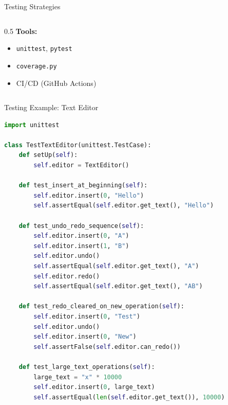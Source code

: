 \documentclass[aspectratio=169,xcolor=dvipsnames]{beamer}
\begin{document}
\begin{frame}{Testing Strategies}
\begin{columns}
\begin{column}{0.5\textwidth}
      \vspace{0.2cm}
      \textbf{Tools:}
      \begin{itemize}
        \item \texttt{unittest}, \texttt{pytest}
        \item \texttt{coverage.py}
        \item CI/CD (GitHub Actions)
      \end{itemize}
    \end{column}
  \end{columns}
\end{frame}

\begin{frame}[fragile]{Testing Example: Text Editor}
\begin{lstlisting}[language=Python, basicstyle=\tiny\ttfamily]
import unittest

class TestTextEditor(unittest.TestCase):
    def setUp(self):
        self.editor = TextEditor()

    def test_insert_at_beginning(self):
        self.editor.insert(0, "Hello")
        self.assertEqual(self.editor.get_text(), "Hello")

    def test_undo_redo_sequence(self):
        self.editor.insert(0, "A")
        self.editor.insert(1, "B")
        self.editor.undo()
        self.assertEqual(self.editor.get_text(), "A")
        self.editor.redo()
        self.assertEqual(self.editor.get_text(), "AB")

    def test_redo_cleared_on_new_operation(self):
        self.editor.insert(0, "Test")
        self.editor.undo()
        self.editor.insert(0, "New")
        self.assertFalse(self.editor.can_redo())

    def test_large_text_operations(self):
        large_text = "x" * 10000
        self.editor.insert(0, large_text)
        self.assertEqual(len(self.editor.get_text()), 10000)
\end{lstlisting}
\end{frame}
\end{document}
